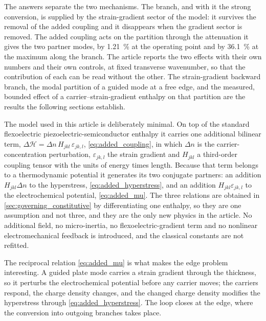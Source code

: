The answers separate the two mechanisms.  The branch, and with it the strong
conversion, is supplied by the strain-gradient sector of the model: it survives
the removal of the added coupling and it disappears when the gradient sector is
removed.  The added coupling acts on the partition through the attenuation it
gives the two partner modes, by \SI{1.21}{\percent} at the operating point and
by \SI{36.1}{\percent} at the maximum along the branch.  The article reports the
two effects with their own numbers and their own controls, at fixed transverse
wavenumber, so that the contribution of each can be read without the other.
The strain-gradient backward branch, the modal partition of a guided mode at a
free edge, and the measured, bounded effect of a carrier--strain-gradient
enthalpy on that partition are the results the following sections establish.

\label{sec:intro_coupling}
The model used in this article is deliberately minimal.  On top of the standard
flexoelectric piezoelectric-semiconductor enthalpy it carries one additional
bilinear term, $\Delta\mathcal{H}=\Delta n\,H_{jkl}\,\varepsilon_{jk,l}$,
\eqref{eq:added_coupling}, in which $\Delta n$ is the carrier-concentration
perturbation, $\varepsilon_{jk,l}$ the strain gradient and $H_{jkl}$ a
third-order coupling tensor with the units of energy times length.  Because that
term belongs to a thermodynamic potential it generates its two conjugate
partners: an addition $H_{jkl}\Delta n$ to the hyperstress,
\eqref{eq:added_hyperstress}, and an addition $H_{jkl}\varepsilon_{jk,l}$ to the
electrochemical potential, \eqref{eq:added_mu}.  The three relations are
obtained in \cref{sec:governing_constitutive} by differentiating one enthalpy, so
they are one assumption and not three, and they are the only new physics in the
article.  No additional field, no micro-inertia, no flexoelectric-gradient term
and no nonlinear electromechanical feedback is introduced, and the classical
constants are not refitted.

The reciprocal relation \eqref{eq:added_mu} is what makes the edge problem
interesting.  A guided plate mode carries a strain gradient through the
thickness, so it perturbs the electrochemical potential before any carrier
moves; the carriers respond, the charge density changes, and the changed charge
density modifies the hyperstress through \eqref{eq:added_hyperstress}.  The loop
closes at the edge, where the conversion into outgoing branches takes place.

\label{sec:intro_scope}

